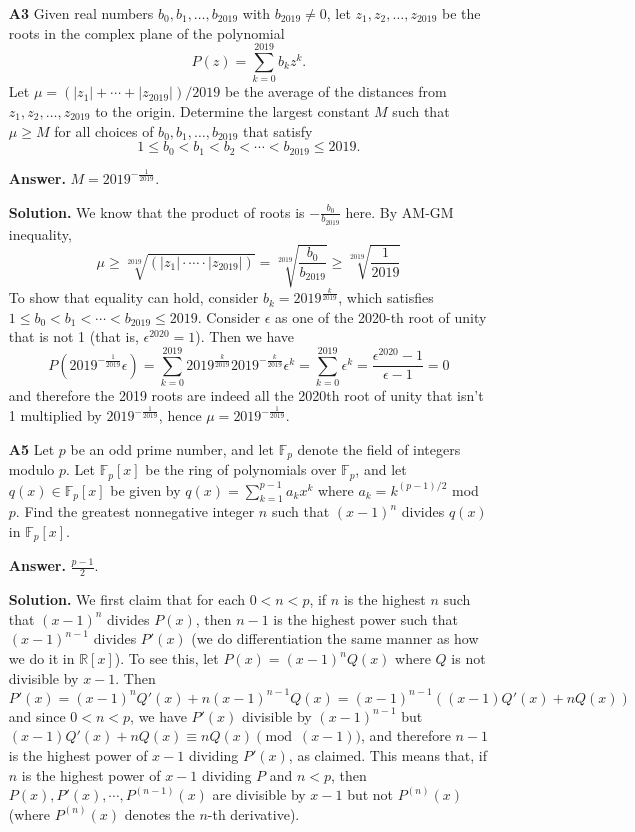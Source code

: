 \documentclass[11pt,a4paper]{article}
\newcommand{\bbR}{\mathbb R}
\newcommand{\<}{\langle}
\renewcommand{\>}{\rangle}
\begin{document}
\begin{enumerate}
	\item [\textbf{A3}] Given real numbers $b_0,b_1,\ldots, b_{2019}$ with $b_{2019}\neq 0$, let $z_1,z_2,\ldots, z_{2019}$ be the roots in the complex plane of the polynomial
	\[
	P(z) = \sum_{k=0}^{2019}b_kz^k.
	\]Let $\mu = (|z_1|+ \cdots + |z_{2019}|)/2019$ be the average of the distances from $z_1,z_2,\ldots, z_{2019}$ to the origin.  Determine the largest constant $M$ such that $\mu\geq M$ for all choices of $b_0,b_1,\ldots, b_{2019}$ that satisfy
	\[
	1\leq b_0 < b_1 < b_2 < \cdots < b_{2019} \leq 2019.
	\]
	
	\textbf{Answer.} $M=2019^{-\frac{1}{2019}}$. 
	
	\textbf{Solution.} We know that the product of roots is $-\frac{b_0}{b_{2019}}$ here. By AM-GM inequality, 
	\[
	\mu\ge \sqrt[2019]{(|z_1|\cdot\cdots\cdot |z_{2019}|)}=\sqrt[2019]{\frac{b_0}{b_{2019}}}\ge \sqrt[2019]{\frac{1}{2019}}
	\]
	To show that equality can hold, consider $b_k=2019^{\frac{k}{2019}}$, which satisfies $1\le b_0<b_1<\cdots<b_{2019}\le 2019$. 
	Consider $\epsilon$ as one of the 2020-th root of unity that is not 1 (that is, $\epsilon^{2020}=1$). Then we have 
	\[
	P(2019^{-\frac{1}{2019}}\epsilon)=\sum_{k=0}^{2019}2019^{\frac{k}{2019}}2019^{-\frac{k}{2019}}\epsilon^k = \sum_{k=0}^{2019}\epsilon^k = \frac{\epsilon^{2020}-1}{\epsilon-1}=0
	\]
	and therefore the 2019 roots are indeed all the 2020th root of unity that isn't 1 multiplied by $2019^{-\frac{1}{2019}}$, hence $\mu=2019^{-\frac{1}{2019}}$. 
	
	\item [\textbf{A5}] Let $p$ be an odd prime number, and let $\mathbb{F}_p$ denote the field of integers modulo $p$. Let $\mathbb{F}_p[x]$ be the ring of polynomials over $\mathbb{F}_p$, and let $q(x) \in \mathbb{F}_p[x]$ be given by $q(x) = \sum_{k=1}^{p-1} a_k x^k$ where $a_k = k^{(p-1)/2}$ mod $p$. Find the greatest nonnegative integer $n$ such that $(x-1)^n$ divides $q(x)$ in $\mathbb{F}_p[x]$.
	
	\textbf{Answer.} $\frac{p-1}{2}$. 
	
	\textbf{Solution.} We first claim that for each $0<n<p$, if $n$ is the highest $n$ such that $(x-1)^n$ divides $P(x)$, then $n-1$ is the highest power such that $(x-1)^{n-1}$ divides $P'(x)$ (we do differentiation the same manner as how we do it in $\bbR[x]$). To see this, let $P(x)=(x-1)^nQ(x)$ where $Q$ is not divisible by $x-1$. Then 
	\[
	P'(x)=(x-1)^nQ'(x)+n(x-1)^{n-1}Q(x)=(x-1)^{n-1}((x-1)Q'(x)+nQ(x))
	\]
	and since $0<n<p$, we have $P'(x)$ divisible by $(x-1)^{n-1}$ but $(x-1)Q'(x)+nQ(x)\equiv nQ(x)\pmod{(x-1)}$, and therefore $n-1$ is the highest power of $x-1$ dividing $P'(x)$, as claimed. 
	This means that, if $n$ is the highest power of $x-1$ dividing $P$ and $n<p$, then $P(x), P'(x), \cdots, P^{(n-1)}(x)$ are divisible by $x-1$ but not $P^{(n)}(x)$ (where $P^{(n)}(x)$ denotes the $n$-th derivative). 
	

\end{enumerate}
\end{document}
